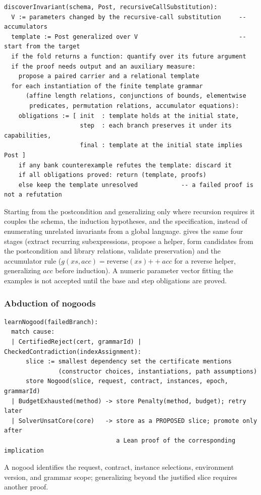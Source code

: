 \begin{lstlisting}
discoverInvariant(schema, Post, recursiveCallSubstitution):
  V := parameters changed by the recursive-call substitution     -- accumulators
  template := Post generalized over V                            -- start from the target
  if the fold returns a function: quantify over its future argument
  if the proof needs output and an auxiliary measure:
    propose a paired carrier and a relational template
  for each instantiation of the finite template grammar
      (affine length relations, conjunctions of bounds, elementwise
       predicates, permutation relations, accumulator equations):
    obligations := [ init  : template holds at the initial state,
                     step  : each branch preserves it under its capabilities,
                     final : template at the initial state implies Post ]
    if any bank counterexample refutes the template: discard it
    if all obligations proved: return (template, proofs)
    else keep the template unresolved            -- a failed proof is not a refutation
\end{lstlisting}
Starting from the postcondition and generalizing only where recursion requires it couples the schema, the induction hypotheses, and the specification, instead of enumerating unrelated invariants from a global language.  gives the same four stages (extract recurring subexpressions, propose a helper, form candidates from the postcondition and library relations, validate preservation) and  the accumulator rule ($g(xs,acc)=\mathrm{reverse}(xs)\mathbin{++}acc$ for a reverse helper, generalizing $acc$ before induction). A numeric parameter vector fitting the examples is not accepted until the base and step obligations are proved.

\subsubsection{Abduction of nogoods}

\begin{lstlisting}
learnNogood(failedBranch):
  match cause:
  | CertifiedReject(cert, grammarId) | CheckedContradiction(indexAssignment):
      slice := smallest dependency set the certificate mentions
               (constructor choices, instantiations, path assumptions)
      store Nogood(slice, request, contract, instances, epoch, grammarId)
  | BudgetExhausted(method) -> store Penalty(method, budget); retry later
  | SolverUnsatCore(core)   -> store as a PROPOSED slice; promote only after
                               a Lean proof of the corresponding implication
\end{lstlisting}
A nogood identifies the request, contract, instance selections, environment version, and grammar scope; generalizing beyond the justified slice requires another proof.

